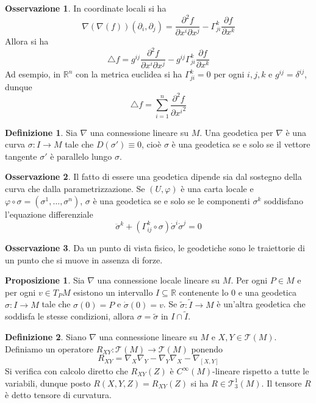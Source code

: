 \documentclass[a4paper,11pt]{article}
\theoremstyle{definition}
\newtheorem{osservazione}{Osservazione}[section]
\newtheorem{definizione}{Definizione}[section]
\theoremstyle{theorem}
\newtheorem{proposizione}{Proposizione}[section]
\newcommand{\R}{\mathbb{R}}
\newcommand{\T}{\mathcal{T}}
\begin{document}
\begin{osservazione}
	In coordinate locali si ha
	\[\nabla\left(\nabla(f)\right)(\partial_i,\partial_j)=\frac{\partial^2f}{\partial x^i\partial x^j}-\Gamma^k_{ji}\frac{\partial f}{\partial x^k}\]
	Allora si ha
	\[\triangle f=g^{ij}\frac{\partial^2 f}{\partial x^i\partial x^j}-g^{ij}\Gamma^k_{ji}\frac{\partial f}{\partial x^k}\]
	Ad esempio, in $\R^n$ con la metrica euclidea si ha $\Gamma^{k}_{ji}=0$ per ogni $i,j,k$ e $g^{ij}=\delta^{ij}$, dunque
	\[\triangle f=\sum_{i=1}^{n}\frac{\partial^2f}{\partial {x^i}^2}\]
\end{osservazione}
\begin{definizione}
	Sia $\nabla$ una connessione lineare su $M$. Una geodetica per $\nabla$ è una curva $\sigma\colon I\to M$ tale che $D\left(\sigma'\right)\equiv0$, cioè $\sigma$ è una geodetica se e solo se il vettore tangente $\sigma'$ è parallelo lungo $\sigma$.
\end{definizione}
\begin{osservazione}
	Il fatto di essere una geodetica dipende sia dal sostegno della curva che dalla parametrizzazione. Se $(U,\varphi)$ è una carta locale e $\varphi\circ\sigma=(\sigma^1,\dots,\sigma^n)$, $\sigma$ è una geodetica se e solo se le componenti $\sigma^k$ soddisfano l'equazione differenziale
	\[\ddot{\sigma}^k+\left(\Gamma^k_{ij}\circ\sigma\right)\dot{\sigma}^i\dot{\sigma}^j=0\]
\end{osservazione}
\begin{osservazione}
	Da un punto di vista fisico, le geodetiche sono le traiettorie di un punto che si muove in assenza di forze.
\end{osservazione}
\begin{proposizione}
	Sia $\nabla$ una connessione locale lineare su $M$. Per ogni $P\in M$ e per ogni $v\in T_PM$ esistono un intervallo $I\subseteq\R$ contenente lo 0 e una geodetica $\sigma\colon I\to M$ tale che $\sigma(0)=P$ e $\dot{\sigma}(0)=v$. Se $\tilde{\sigma}\colon\tilde{I}\to M$ è un'altra geodetica che soddisfa le stesse condizioni, allora $\sigma=\tilde{\sigma}$ in $I\cap\tilde{I}$.
\end{proposizione}
\begin{definizione}
	Siano $\nabla$ una connessione lineare su $M$ e $X,Y\in\T(M)$. Definiamo un operatore $R_{XY}\colon\T(M)\to\T(M)$ ponendo
	\[R_{XY}=\nabla_X\nabla_Y-\nabla_Y\nabla_X-\nabla_{[X,Y]}\]
	Si verifica con calcolo diretto che $R_{XY}(Z)$ è $C^\infty(M)$-lineare rispetto a tutte le variabili, dunque posto $R(X,Y,Z)=R_{XY}(Z)$ si ha $R\in\T^1_3(M)$. Il tensore $R$ è detto tensore di curvatura.
\end{definizione}
\end{document}
